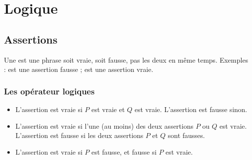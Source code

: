 \documentclass[11pt,class=report,crop=false]{standalone}
\begin{document}





\section{Logique}

\subsection{Assertions}

Une  est une phrase soit vraie, soit fausse, pas les deux en même temps. 
Exemples :  est une assertion fausse ;   est une assertion vraie.


\subsubsection*{Les opérateur logiques}

\begin{itemize}
  \item L'assertion  est vraie si $P$ est vraie et $Q$ est vraie. L'assertion  est fausse sinon.

  \item L'assertion  est vraie si l'une (au moins) des deux assertions $P$ ou $Q$ est vraie.
L'assertion  est fausse si les deux assertions $P$ et $Q$ sont fausses.

  \item L'assertion  est vraie si $P$ est fausse, et fausse si $P$ est vraie.
\end{itemize}
\end{document}
